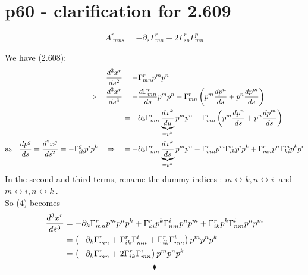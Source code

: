 \section{p60 - clarification for 2.609}
\begin{tcolorbox}
$$A^r_{.mns} = - \partial_s \Gamma^r_{mn} + 2 \Gamma^r_{sp}\Gamma^p_{mn}$$
\end{tcolorbox}
We have (2.608):
\begin{align}
\dv[2] {x^r}{s} &= - \Gamma^r_{mn}p^m p^n\\
\quad\Rightarrow\quad \dv[3] {x^r}{s} &= - \dv{\Gamma^r_{mn}}{s}p^m p^n- \Gamma^r_{mn}\left(p^m \dv{p^n}{s}+p^n \dv{p^m}{s} \right)\\
\ & = - \partial_k \Gamma^r_{mn}\underbrace{\dv{x^k}{u}}_{= p^k}p^m p^n- \Gamma^r_{mn}\left(p^m \dv{p^n}{s}+p^n \dv{p^m}{s} \right)\\
\text{as}\quad \dv{p^g}{s} = \dv[2] {x^g}{s} = - \Gamma^g_{ik}p^i p^k \quad\Rightarrow\quad  & = - \partial_k \Gamma^r_{mn}\underbrace{\dv{x^k}{s}}_{= p^k}p^m p^n + \Gamma^r_{mn}p^m \Gamma^n_{ik}p^i p^k+ \Gamma^r_{mn}p^n \Gamma^m_{ki}p^k p^i 
\end{align}
In the second and third terms, rename the dummy indices : $ m \leftrightarrow k,  n \leftrightarrow i\ $  and $ m \leftrightarrow i,  n \leftrightarrow k\ $.\\
So (4) becomes
\begin{align}
\dv[3] {x^r}{s} &=  - \partial_k \Gamma^r_{mn} p^m p^np^k +\Gamma^r_{ki}p^k \Gamma^i_{nm}p^n p^m+ \Gamma^r_{ik}p^k \Gamma^i_{nm}p^n p^m\\
\ &=  \left( - \partial_k \Gamma^r_{mn}  +\Gamma^r_{ik} \Gamma^i_{mn}+ \Gamma^r_{ik} \Gamma^i_{nm} \right)p^m p^np^k\\
\ &=  \left( - \partial_k \Gamma^r_{mn}  +2\Gamma^r_{ik} \Gamma^i_{mn}\right)p^m p^np^k
\end{align}
$$\blacklozenge$$
\newpage

